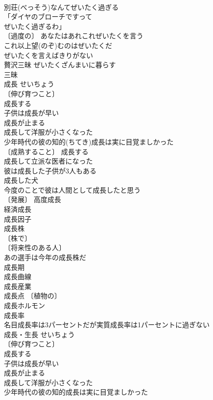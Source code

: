 \documentclass[8pt]{extreport}
\begin{document}
\begin{CJK}{UTF8}{min}
\\	別荘(べっそう)なんてぜいたく過ぎる 
\\	「ダイヤのブローチですって
\\	ぜいたく過ぎるわ」 
\\	〔過度の〕 あなたはあれこれぜいたくを言う 
\\	これ以上望(のぞ)むのはぜいたくだ 
\\	ぜいたくを言えばきりがない 
\\	贅沢三昧 ぜいたくざんまいに暮らす 
\\	三昧 
\\	成長	せいちょう	
\\	〔伸び育つこと〕
\\	成長する 
\\	子供は成長が早い 
\\	成長が止まる 
\\	成長して洋服が小さくなった 
\\	少年時代の彼の知的(ちてき)成長は実に目覚ましかった 
\\	〔成熟すること〕 成長する 
\\	成長して立派な医者になった 
\\	彼は成長した子供が3人もある 
\\	成長した犬 
\\	今度のことで彼は人間として成長したと思う 
\\	〔発展〕 高度成長 
\\	経済成長 
\\	成長因子 
\\	成長株 
\\	〔株で〕
\\	〔将来性のある人〕
\\	あの選手は今年の成長株だ 
\\	成長期 
\\	成長曲線 
\\	成長産業 
\\	成長点 〔植物の〕
\\	成長ホルモン 
\\	成長率 
\\	名目成長率は3パーセントだが実質成長率は1パーセントに過ぎない 
\\	成長・生長	せいちょう	
\\	〔伸び育つこと〕
\\	成長する 
\\	子供は成長が早い 
\\	成長が止まる 
\\	成長して洋服が小さくなった 
\\	少年時代の彼の知的成長は実に目覚ましかった 

\end{CJK}
\end{document}
